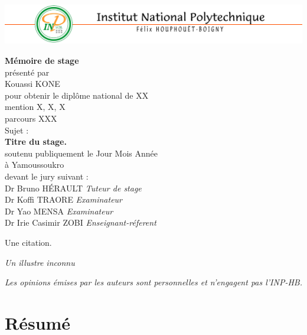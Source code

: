 \documentclass[12pt,]{article}
\let\oldsection\section
\renewcommand\section{\clearpage\oldsection}
\begin{document}
  \includegraphics[width=0.3\columnwidth]{images/INPHB.png}
  
  \begin{center}
    \LARGE{\textbf{Mémoire de stage}} \\
    \vspace*{\fill}
    \large{présenté par} \\
    \large{Kouassi KONE} \\
    \vspace*{\fill}
    \large{pour obtenir le diplôme national de XX} \\
    \large{mention X, X, X} \\
    \small{parcours XXX} \\
    \vspace*{\fill}
    \large{Sujet :} \\
    \Large{\textbf{Titre du stage.}} \\
    \vspace*{\fill}
    \large{soutenu publiquement le Jour Mois Année} \\
    \large{à Yamoussoukro} \\
    \vspace*{\fill}
    \large{devant le jury suivant :} \\
    \vspace*{\fill}
    Dr Bruno HÉRAULT  \emph{Tuteur de stage} \\
    Dr Koffi TRAORE  \emph{Examinateur} \\
    Dr Yao MENSA  \emph{Examinateur} \\
    Dr Irie Casimir ZOBI  \emph{Enseignant-réferent} \\
  \end{center}
  
  \newpage
  \vspace*{\fill}
  \epigraph{Une citation.}{\textit{Un illustre inconnu}}
  \vspace*{\fill}
  \emph{Les opinions émises par les auteurs sont personnelles et n'engagent pas l'INP-HB.}
  \newpage

\tableofcontents
\listoftables
\listoffigures

\hypertarget{resume}{%
\section{Résumé}\label{resume}}
\end{document}

